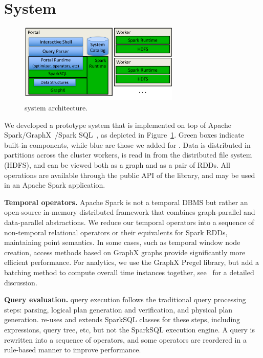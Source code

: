 \section{System}
\label{sec:sys}

\begin{figure}[t]
\centering
\includegraphics[width=3in]{figs/architecture.pdf}
\vspace{-0.5cm}
\caption{\sys system architecture.}
\vspace{-0.5cm}
\label{fig:arch}
\end{figure}

We developed a prototype system \sys that is implemented on top of
Apache Spark/GraphX~\cite{DBLP:conf/osdi/GonzalezXDCFS14}/Spark
SQL~\cite{Armbrust2015}, as depicted in Figure~\ref{fig:arch}.  Green
boxes indicate built-in components, while blue are those we added for
\sys.  Data is distributed in partitions across the cluster workers,
is read in from the distributed file system (HDFS), and can be viewed
both as a graph and as a pair of RDDs.  All \tg operations are
available through the public API of the \sys library, and may be used
in an Apache Spark application.

{\bf Temporal operators.}  Apache Spark is not a temporal DBMS but
rather an open-source in-memory distributed framework that combines
graph-parallel and data-parallel abstractions.  We reduce our temporal
operators into a sequence of non-temporal relational operators or their
equivalents for Spark RDDs, maintaining point semantics.  In some
cases, such as temporal window node creation, access methods based on
GraphX graphs provide significantly more efficient performance.  For
analytics, we use the GraphX Pregel library, but add a batching method
to compute overall time instances together,
see~\cite{MoffittTempWeb16} for a detailed discussion.

{\bf Query evaluation.}  \sys query execution follows the traditional
query processing steps: parsing, logical plan generation and
verification, and physical plan generation. \sys re-uses and extends
SparkSQL classes for these steps, including expressions, query tree,
etc, but not the SparkSQL execution engine.  A \ql query is rewritten
into a sequence of \tga operators, and some operators are reordered in
a rule-based manner to improve performance.

